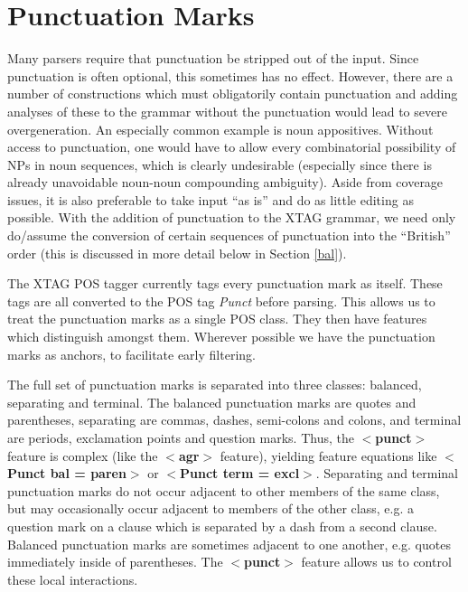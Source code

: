 
\chapter{Punctuation Marks}
\label{punct-chapt}

Many parsers require that punctuation be stripped out of the
input. Since punctuation is often optional, this sometimes has no
effect. However, there are a number of constructions which must
obligatorily contain punctuation and adding analyses of these to the
grammar without the punctuation would lead to severe
overgeneration. An especially common example is noun
appositives. Without access to punctuation, one would have to allow
every combinatorial possibility of NPs in noun sequences, which is
clearly undesirable (especially since there is already unavoidable
noun-noun compounding ambiguity). Aside from coverage issues, it is
also preferable to take input ``as is'' and do as little editing as
possible. With the addition of punctuation to the XTAG grammar, we
need only do/assume the conversion of certain sequences of punctuation
into the ``British'' order (this is discussed in more detail below in
Section \ref{bal}).

The XTAG POS tagger currently tags every punctuation mark as
itself. These tags are all converted to the POS tag {\it Punct} before
parsing. This allows us to treat the punctuation marks as a single POS
class. They then have features which distinguish amongst them.
Wherever possible we have the punctuation marks as anchors, to
facilitate early filtering.

The full set of punctuation marks is separated into three classes:
balanced, separating and terminal. The balanced punctuation marks are
quotes and parentheses, separating are commas, dashes, semi-colons and
colons, and terminal are periods, exclamation points and question
marks. Thus, the {\bf $<$punct$>$} feature is complex (like the {\bf
$<$agr$>$} feature), yielding feature equations like {\bf $<$Punct bal
= paren$>$} or {\bf $<$Punct term = excl$>$}. Separating and terminal
punctuation marks do not occur adjacent to other members of the same
class, but may occasionally occur adjacent to members of the other
class, e.g. a question mark on a clause which is separated by a dash
from a second clause. Balanced punctuation marks are sometimes adjacent
to one another, e.g. quotes immediately inside of parentheses. The
{\bf $<$punct$>$} feature allows us to control these local
interactions.

